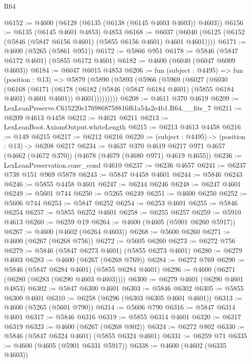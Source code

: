 \begin{lexlean}{R64}
\begin{coremodule}
@6152 := @4600 (@6128 (@6135 (@6138 (@6145 @4603 @4603)) @4603))
@6156 := @6135 (@6145 @4601 @4853) @4853
@6168 := @6037 (@6040 (@6125 (@6152 (@5846 (@5847 @6156 @4601) (@5855 @6156 @4601) @4601 @4601))))
@6171 := @4600 (@5265 (@5861 @951))
@6172 := @5866 @951
@6178 := @5846 (@5847 @6172 @4601) (@5855 @6172 @4601)
@6182 := @4600 (@6040 (@6047 @6009 @4603))
@6184 := @6047 @6015 @4853
@6206 := fun (subject : @4495) =>
  fun (position : @13) =>
  @5879
    (@5890
      (@5893
        (@5966
          (@5969
            (@6027
              (@6030
                (@6168
                  (@6171
                    (@6178
                      (@6182 (@5846 (@5847 @6184 @4601) (@5855 @6184 @4601) @4601 @4601))
                      @4601)))))))))
@6208 := @4611 @370 @4619
@6209 := LexLeanPreserve.C615220e1769868758816f61a54a2e4b1.R64.__fits_7
@6211 := @6209 @4613 @4458
@6212 := @4621 @6211
@6213 := LexLeanBoot.AxiomOutput.whiteLength
@6215 := @6213 @4613 @4458
@6216 := @149 @6215
@6217 := @6212 @6216
@6220 := (subject : @4495) -> (position : @13) -> @6208 @6217
@6234 := @4637
    @370
    @4619
    @6217
    @971
    @4657
    (@4662 (@4672 @370))
    (@4678 (@4679 (@4680 @971) @4619 @4655))
@6236 := LexLeanPreservation.conv_cond @4610
@6237 := @6236 @4657
@6241 := @6237 @738 @151 @969 @5878
@6243 := @5847 @4458 @4601
@6244 := @5846 @6243
@6246 := @5855 @4458 @4601
@6247 := @6244 @6246
@6248 := @6247 @4601
@6249 := @5601 @744
@6250 := @5265 @6249
@6251 := @4600 @6250
@6252 := @5606 @744
@6253 := @5847 @6252
@6254 := @6253 @4601
@6255 := @5846 @6254
@6257 := @5855 @6252 @4601
@6258 := @6255 @6257
@6259 := @5910 @4613
@6260 := @6259 @19
@6264 := @4600 (@4605 (@5901 @6260 @5917))
@6267 := @4600 (@4602 (@6264 @4603))
@6268 := @5600 @6260
@6271 := @4600 (@6267 (@6268 @756))
@6272 := @5605 @6260
@6273 := @6272 @756
@6279 := @5846 (@5847 @6273 @4601) (@5855 @6273 @4601)
@6280 := @6279 @4603
@6283 := @4600 (@6267 (@6268 @769))
@6284 := @6272 @769
@6290 := @5846 (@5847 @6284 @4601) (@5855 @6284 @4601)
@6296 := @4600 (@6271 (@6280 (@6283 (@6290 @4603 @4603))))
@6300 := @6279 @4601 (@6290 @4601 @4853)
@6302 := @5847 @6300 @4601
@6303 := @5846 @6302
@6305 := @5855 @6300 @4601
@6310 := @6258 (@6296 (@6303 @6305 @4601 @4601))
@6313 := @4600 (@5265 (@5601 @790))
@6314 := @5606 @790
@6316 := @5847 @6314 @4601
@6317 := @5846 @6316
@6319 := @5855 @6314 @4601
@6320 := @6317 @6319
@6323 := @4600 (@6267 (@6268 @802))
@6324 := @6272 @802
@6330 := @5846 (@5847 @6324 @4601) (@5855 @6324 @4601)
@6331 := @6259 @71
@6335 := @4600 (@4605 (@5901 @6331 @5917))
@6338 := @4600 (@4602 (@6335 @4603))

\end{coremodule}
\end{lexlean}
